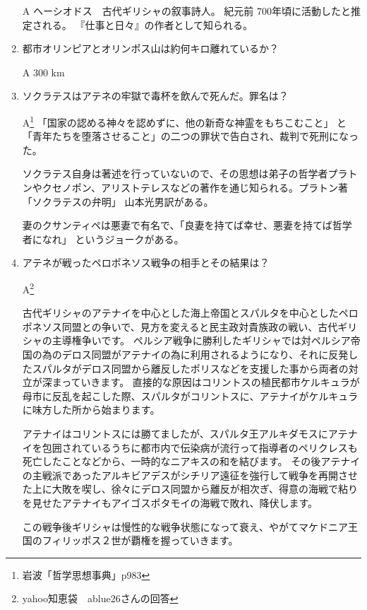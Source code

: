 \documentclass[fleqn]{article}
\begin{document}
\begin{enumerate}
{\vspace{1zw}A ヘーシオドス　古代ギリシャの叙事詩人。
紀元前	700年頃に活動したと推定される。
『仕事と日々』の作者として知られる。


}
\item{都市オリンピアとオリンポス山は約何キロ離れているか？

\vspace{1zw}A 300 km


}
\item{ソクラテスはアテネの牢獄で毒杯を飲んで死んだ。罪名は？

\vspace{1zw}A\footnote{岩波「哲学思想事典」p983}
 「国家の認める神々を認めずに、他の新奇な神霊をもちこむこと」
と「青年たちを堕落させること」の二つの罪状で告白され、裁判で死刑になった。

ソクラテス自身は著述を行っていないので、その思想は弟子の哲学者プラトンやクセノポン、アリストテレスなどの著作を通じ知られる。プラトン著「ソクラテスの弁明」
山本光男訳がある。


妻のクサンティペは悪妻で有名で、「良妻を持てば幸せ、悪妻を持てば哲学者になれ」
というジョークがある。
}
\item{アテネが戦ったペロポネソス戦争の相手とその結果は？

\vspace{1zw}A\footnote{yahoo知恵袋　ablue26さんの回答}

古代ギリシャのアテナイを中心とした海上帝国とスパルタを中心としたペロポネソス同盟との争いで、見方を変えると民主政対貴族政の戦い、古代ギリシャの主導権争いです。
ペルシア戦争に勝利したギリシャでは対ペルシア帝国の為のデロス同盟がアテナイの為に利用されるようになり、それに反発したスパルタがデロス同盟から離反したポリスなどを支援した事から両者の対立が深まっていきます。
 直接的な原因はコリントスの植民都市ケルキュラが母市に反乱を起こした際、スパルタがコリントスに、アテナイがケルキュラに味方した所から始まります。

アテナイはコリントスには勝てましたが、スパルタ王アルキダモスにアテナイを包囲されているうちに都市内で伝染病が流行って指導者のペリクレスも死亡したことなどから、一時的なニアキスの和を結びます。
その後アテナイの主戦派であったアルキビアデスがシチリア遠征を強行して戦争を再開させた上に大敗を喫し、徐々にデロス同盟から離反が相次ぎ、得意の海戦で粘りを見せたアテナイもアイゴスポタモイの海戦で敗れ、降伏します。

この戦争後ギリシャは慢性的な戦争状態になって衰え、やがてマケドニア王国のフィリッポス２世が覇権を握っていきます。
}
\end{enumerate}
\end{document}
